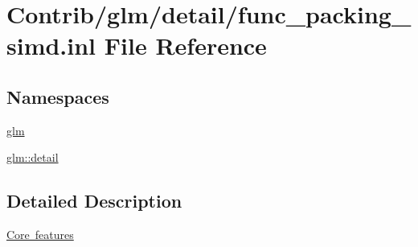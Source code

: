 \hypertarget{func__packing__simd_8inl}{}\section{Contrib/glm/detail/func\+\_\+packing\+\_\+simd.inl File Reference}
\label{func__packing__simd_8inl}
\subsection*{Namespaces}
\begin{DoxyCompactItemize}
\item 
 \mbox{\hyperlink{namespaceglm}{glm}}
\item 
 \mbox{\hyperlink{namespaceglm_1_1detail}{glm\+::detail}}
\end{DoxyCompactItemize}


\subsection{Detailed Description}
\mbox{\hyperlink{group__core}{Core features}} 